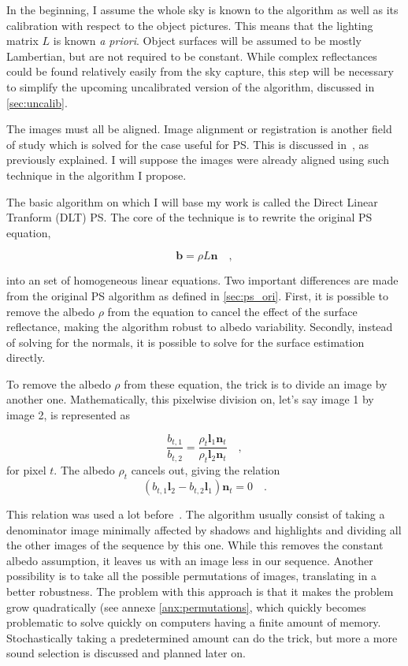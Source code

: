 \documentclass{report}
\begin{document}
In the beginning, I assume the whole sky is known to the algorithm as well as its calibration with respect to the object pictures. This means that the lighting matrix $L$ is known \emph{a priori}. Object surfaces will be assumed to be mostly Lambertian, but are not required to be constant. While complex reflectances could be found relatively easily from the sky capture, this step will be necessary to simplify the upcoming uncalibrated version of the algorithm, discussed in \ref{sec:uncalib}.

The images must all be aligned. Image alignment or registration is another field of study which is solved for the case useful for PS. This is discussed in~\cite{ackermann-cvpr-12}, as previously explained. I will suppose the images were already aligned using such technique in the algorithm I propose.

The basic algorithm on which I will base my work is called the Direct Linear Tranform (DLT) PS. The core of the technique is to rewrite the original PS equation,

\begin{equation}
\mathbf{b} = \rho L \mathbf{n}  \quad,
\end{equation}

into an set of homogeneous linear equations. Two important differences are made from the original PS algorithm as defined in \ref{sec:ps_ori}. First, it is possible to remove the albedo $\rho$ from the equation to cancel the effect of the surface reflectance, making the algorithm robust to albedo variability. Secondly, instead of solving for the normals, it is possible to solve for the surface estimation directly. 

To remove the albedo $\rho$ from these equation, the trick is to divide an image by another one. Mathematically, this pixelwise division on, let's say image 1 by image 2, is represented as

\begin{equation}
\frac{b_{t,1}}{b_{t,2}} = \frac{\rho_t \mathbf{l}_1 \mathbf{n}_t}{\rho_t \mathbf{l}_2 \mathbf{n}_t} \quad,
\end{equation}
for pixel $t$. The albedo $\rho_t$ cancels out, giving the relation
\begin{equation}
\label{eq:ratio_images}
\left( b_{t,1} \mathbf{l}_2 - b_{t,2} \mathbf{l}_1 \right) \mathbf{n}_t = 0  \quad.
\end{equation}

This relation was used a lot before~\cite{yu-iccp-13,wu-pami-06}. The algorithm usually consist of taking a denominator image minimally affected by shadows and highlights and dividing all the other images of the sequence by this one. While this removes the constant albedo assumption, it leaves us with an image less in our sequence. Another possibility is to take all the possible permutations of images, translating in a better robustness. The problem with this approach is that it makes the problem grow quadratically (see annexe \ref{anx:permutations}, which quickly becomes problematic to solve quickly on computers having a finite amount of memory. Stochastically taking a predetermined amount can do the trick, but more a more sound selection is discussed and planned later on.
 
\end{document}
